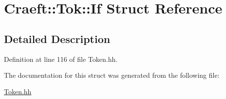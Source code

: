\hypertarget{struct_craeft_1_1_tok_1_1_if}{}\section{Craeft\+:\+:Tok\+:\+:If Struct Reference}
\label{struct_craeft_1_1_tok_1_1_if}


\subsection{Detailed Description}


Definition at line 116 of file Token.\+hh.



The documentation for this struct was generated from the following file\+:\begin{DoxyCompactItemize}
\item 
\hyperlink{_token_8hh}{Token.\+hh}\end{DoxyCompactItemize}
